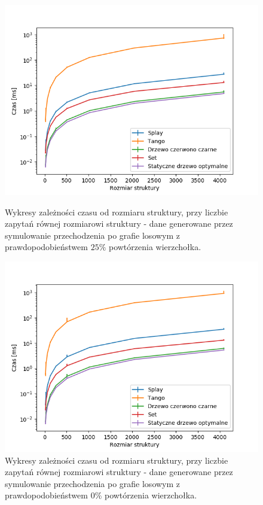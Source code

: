 \documentclass[declaration,shortabstract]{iithesis}
\theoremstyle{thm}
\theoremstyle{remark}
\theoremstyle{plain}
\theoremstyle{plain}
\theoremstyle{plain}
\begin{document}
\begin{figure}[ht]
\begin{minipage}[b]{.45\textwidth}
\centering
\includegraphics[width=1\textwidth]{wykresy/randwalk75_main.png}
\caption{Wykresy zależności czasu od rozmiaru struktury, przy liczbie zapytań równej rozmiarowi struktury - dane generowane przez symulowanie przechodzenia po grafie losowym z prawdopodobieństwem  \(25\%\) powtórzenia wierzchołka. }
\end{minipage}
\hfill
\begin{minipage}[b]{.45\textwidth}
\centering
\includegraphics[width=1\textwidth]{wykresy/randwalk100_main.png}
\caption{Wykresy zależności czasu od rozmiaru struktury, przy liczbie zapytań równej rozmiarowi struktury - dane generowane przez symulowanie przechodzenia po grafie losowym z prawdopodobieństwem  \(0\%\) powtórzenia wierzchołka.}
\end{minipage}
\end{figure}
\end{document}
